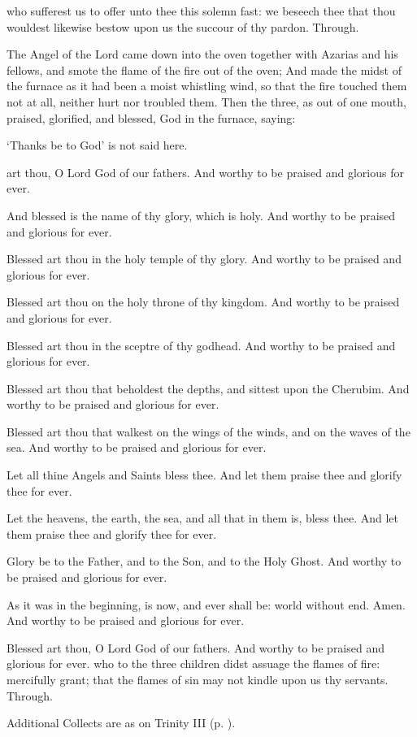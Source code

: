 \collect
{} who sufferest us to offer unto thee this solemn fast: we beseech thee that thou wouldest likewise bestow upon us the succour of thy pardon. Through.

 The Angel of the Lord came down into the oven together with Azarias and his fellows, and smote the flame of the fire out of the oven; And made the midst of the furnace as it had been a moist whistling wind, so that the fire touched them not at all, neither hurt nor troubled them. Then the three, as out of one mouth, praised, glorified, and blessed, God in the furnace, saying:
\begin{rubric}
    `Thanks be to God' is not said here.
\end{rubric}
 art thou, O Lord God of our fathers. And worthy to be praised and glorious for ever.

And blessed is the name of thy glory, which is holy. And worthy to be praised and glorious for ever.

Blessed art thou in the holy temple of thy glory. And worthy to be praised and glorious for ever.

Blessed art thou on the holy throne of thy kingdom. And worthy to be praised and glorious for ever.

Blessed art thou in the sceptre of thy godhead. And worthy to be praised and glorious for ever.

Blessed art thou that beholdest the depths, and sittest upon the Cherubim. And worthy to be praised and glorious for ever.

Blessed art thou that walkest on the wings of the winds, and on the waves of the sea. And worthy to be praised and glorious for ever.

Let all thine Angels and Saints bless thee. And let them praise thee and glorify thee for ever.

Let the heavens, the earth, the sea, and all that in them is, bless thee. And let them praise thee and glorify thee for ever.

Glory be to the Father, and to the Son, and to the Holy Ghost. And worthy to be praised and glorious for ever.

As it was in the beginning, is now, and ever shall be: world without end. Amen. And worthy to be praised and glorious for ever.

Blessed art thou, O Lord God of our fathers. And worthy to be praised and glorious for ever.
\collect
{} who to the three children didst assuage the flames of fire: mercifully grant; that the flames of sin may not kindle upon us thy servants. Through.
\begin{rubric}
    Additional Collects are as on Trinity III (p. \pageref{TrinityIIICollect}).
\end{rubric}

